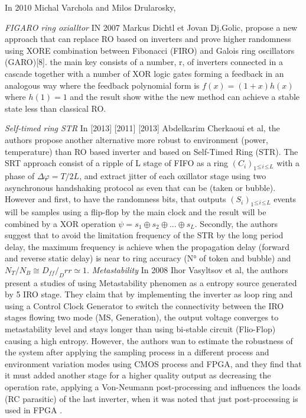In 2010 Michal Varchola and Milos Drularosky,

\textit{FIGARO ring oxialltor} IN 2007 Markus Dichtl et Jovan Dj.Golic, propose a new approach that can replace RO based on inverters and prove higher randomness using XORE combination between Fibonacci (FIRO) and Galois ring oscillators (GARO)[8]. the main key consists of a number, r, of inverters connected in a cascade together with a number of XOR logic gates forming a feedback in an analogous way where the feedback polynomial form is $f(x) = (1+x)h(x)$ where $h(1)=1$ and the result show withe the new method can achieve a stable state less than classical RO. 

\textit{Self-timed ring STR} In [2013] [2011] [2013] Abdelkarim Cherkaoui et al, the authors propose another alternative more robust to environment (power, temperature) than RO based inverter and based on Self-Timed Ring (STR). The SRT approach consist of a ripple of L stage of FIFO as a ring $(C_{i})_{1}{_{\leq}}{_{i}}{_{\leq}}{_{L}}$ with a phase of $\Delta \varphi = T/2L$, and extract jitter of each oxillator stage using two asynchronous handshaking protocol as even that can be (taken or bubble). However and first, to have the randomness bits, that outputs $(S_{i})_{1}{_{\leq}}{_{i}}{_{\leq}}{_{L}}$ events will be samples using a flip-flop by the main clock and the result will be combined by a XOR operation $\psi = s_{1} \oplus s_{2} \oplus ... \oplus s_{L}$. Secondly, the authors suggest that to avoid the limitation frequency of the STR by the long period delay, the maximum frequency is achieve when the propagation delay (forward and reverse static delay) is near to ring accuracy (N° of token and bubble) and $N_{T}/N_{B} \cong D_{ff}/_D{rr} \simeq 1$.
\textit{Metastability}
In 2008 Ihor Vasyltsov et al, the authors present a studies of using Metastability phenomen as a entropy source generated by 5 IRO stage. They claim that by implementing the inverter as loop ring and using a Control Clock Generator to switch the connectivity between the IRO stages flowing two mode (MS, Generation), the output voltage converges to metastability level and stays longer than using bi-stable circuit (Flio-Flop) causing a high entropy. However, the authors wan to estimate the robustness of the system after applying the sampling process in a different process and environment variation modes using CMOS process and FPGA, and they find that it must added another stage for a higher quality output as decreasing the operation rate, applying a Von-Neumann post-processing and influences the loads (RC parasitic) of the last inverter, when it was noted that just post-processing is used in FPGA .

